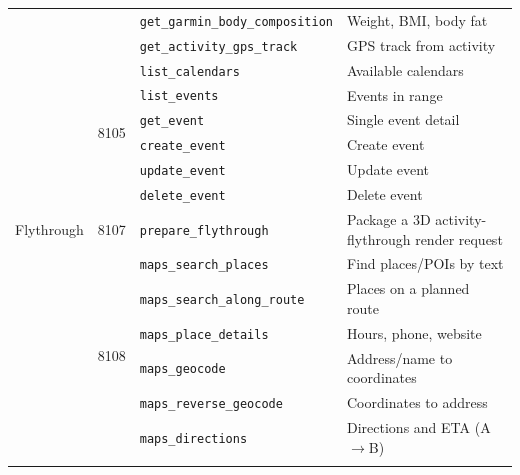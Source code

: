 \begin{table}[ht]
\begin{center}
\begin{minipage}{\textwidth}
\begin{tabularx}{\textwidth}{lllX}
  & & \texttt{get\_garmin\_body\_composition} & Weight, BMI, body fat \\
  & & \texttt{get\_activity\_gps\_track} & GPS track from activity \\
\addlinespace
\multirow{6}{*}{Calendar} & \multirow{6}{*}{8105}
  & \texttt{list\_calendars} & Available calendars \\
  & & \texttt{list\_events} & Events in range \\
  & & \texttt{get\_event} & Single event detail \\
  & & \texttt{create\_event} & Create event \\
  & & \texttt{update\_event} & Update event \\
  & & \texttt{delete\_event} & Delete event \\
\addlinespace
Flythrough & 8107
  & \texttt{prepare\_flythrough} & Package a 3D activity-flythrough render request \\
\addlinespace
\multirow{6}{*}{Google Maps} & \multirow{6}{*}{8108}
  & \texttt{maps\_search\_places} & Find places/POIs by text \\
  & & \texttt{maps\_search\_along\_route} & Places on a planned route \\
  & & \texttt{maps\_place\_details} & Hours, phone, website \\
  & & \texttt{maps\_geocode} & Address/name to coordinates \\
  & & \texttt{maps\_reverse\_geocode} & Coordinates to address \\
  & & \texttt{maps\_directions} & Directions and ETA (A$\to$B) \\
\botrule
\end{tabularx}
\end{minipage}
\end{center}
\end{table}

